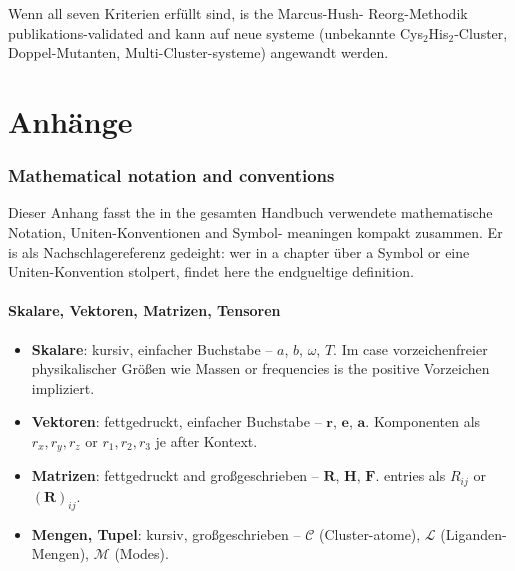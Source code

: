 \documentclass[11pt,a4paper,twoside]{article}
\theoremstyle{remark}
\begin{document}
Wenn all seven Kriterien erf\"ullt sind, is the Marcus-Hush-
Reorg-Methodik publikations-validated and kann auf neue systeme
(unbekannte Cys$_2$His$_2$-Cluster, Doppel-Mutanten,
Multi-Cluster-systeme) angewandt werden.

\appendix

\part{Anh\"ange}

\section{Mathematical notation and conventions}
\label{app:notation}

Dieser Anhang fasst the in the gesamten Handbuch verwendete
mathematische Notation, Uniten-Konventionen and Symbol-
meaningen kompakt zusammen. Er is als Nachschlagereferenz
gedeight: wer in a chapter \"uber a Symbol or eine
Uniten-Konvention stolpert, findet here the endgueltige
definition.

\subsection{Skalare, Vektoren, Matrizen, Tensoren}

\begin{itemize}\setlength{\itemsep}{2pt}
  \item \textbf{Skalare}: kursiv, einfacher Buchstabe -- $a$, $b$,
        $\omega$, $T$. Im case vorzeichenfreier physikalischer
        Gr\"o{\ss}en wie Massen or frequencies is the positive
        Vorzeichen impliziert.
  \item \textbf{Vektoren}: fettgedruckt, einfacher Buchstabe --
        $\mathbf{r}$, $\mathbf{e}$, $\mathbf{a}$. Komponenten als
        $r_x, r_y, r_z$ or $r_1, r_2, r_3$ je after Kontext.
  \item \textbf{Matrizen}: fettgedruckt and gro{\ss}geschrieben --
        $\mathbf{R}$, $\mathbf{H}$, $\mathbf{F}$. entries als
        $R_{ij}$ or $(\mathbf{R})_{ij}$.
  \item \textbf{Mengen, Tupel}: kursiv, gro{\ss}geschrieben --
        $\mathcal{C}$ (Cluster-atome), $\mathcal{L}$
        (Liganden-Mengen), $\mathcal{M}$ (Modes).
\end{itemize}
\end{document}
